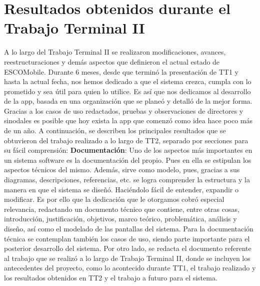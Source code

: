 
\section{Resultados obtenidos durante el Trabajo Terminal II}

\noindent
A lo largo del Trabajo Terminal II se realizaron modificaciones, avances, reestructuraciones y demás aspectos que definieron el actual estado de ESCOMobile. Durante 6 meses, desde que terminó la presentación de TT1 y hasta la actual fecha, nos hemos dedicado a que el sistema crezca, cumpla con lo prometido y sea útil para quien lo utilice. Es así que nos dedicamos al desarrollo de la app, basada en una organización que se planeó y detalló de la mejor forma. Gracias a los casos de uso redactados, pruebas y observaciones de directores y sinodales es posible que hoy exista la app que comenzó como idea hace poco más de un año. 
\newline
A continuación, se describen los principales resultados que se obtuvieron del trabajo realizado a lo largo de TT2, separado por secciones para su fácil comprensión:
\newline
\newline
\textbf{Documentación}: Uno de los aspectos más importantes en un sistema software es la documentación del propio. Pues en ella se estipulan los aspectos técnicos del mismo. Además, sirve como modelo, pues, gracias a sus diagramas, descripciones, referencias, etc. se logra comprender la estructura y la manera en que el sistema se diseñó. Haciéndolo fácil de entender, expandir o modificar. Es por ello que la dedicación que le otorgamos cobró especial relevancia, redactando un documento técnico que contiene, entre otras cosas, introducción, justificación, objetivos, marco teórico, problemática, análisis y diseño, así como el modelado de las pantallas del sistema. Para la documentación técnica se contemplan también los casos de uso, siendo parte importante para el posterior desarrollo del sistema. Por otro lado, se redacta el documento referente al trabajo que se realizó a lo largo de Trabajo Terminal II, donde se incluyen los antecedentes del proyecto, como lo acontecido durante TT1, el trabajo realizado y los resultados obtenidos en TT2 y el trabajo a futuro para el sistema.
\newline
